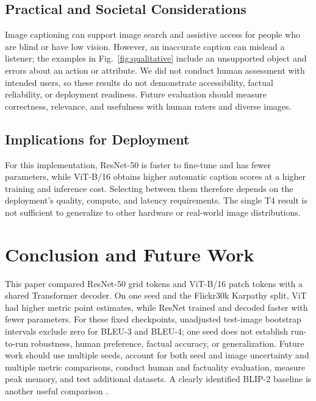 \documentclass[conference]{IEEEtran}
\begin{document}
\subsection{Practical and Societal Considerations}

Image captioning can support image search and assistive access for people who are blind or have low vision. However, an inaccurate caption can mislead a listener; the examples in Fig.~\ref{fig:qualitative} include an unsupported object and errors about an action or attribute. We did not conduct human assessment with intended users, so these results do not demonstrate accessibility, factual reliability, or deployment readiness. Future evaluation should measure correctness, relevance, and usefulness with human raters and diverse images.

\subsection{Implications for Deployment}

For this implementation, ResNet-50 is faster to fine-tune and has fewer parameters, while ViT-B/16 obtains higher automatic caption scores at a higher training and inference cost. Selecting between them therefore depends on the deployment's quality, compute, and latency requirements. The single T4 result is not sufficient to generalize to other hardware or real-world image distributions.

\section{Conclusion and Future Work}

This paper compared ResNet-50 grid tokens and ViT-B/16 patch tokens with a shared Transformer decoder. On one seed and the Flickr30k Karpathy split, ViT had higher metric point estimates, while ResNet trained and decoded faster with fewer parameters. For these fixed checkpoints, unadjusted test-image bootstrap intervals exclude zero for BLEU-3 and BLEU-4; one seed does not establish run-to-run robustness, human preference, factual accuracy, or generalization. Future work should use multiple seeds, account for both seed and image uncertainty and multiple metric comparisons, conduct human and factuality evaluation, measure peak memory, and test additional datasets. A clearly identified BLIP-2 baseline is another useful comparison \cite{li2023,li2023pope}.



\end{document}
